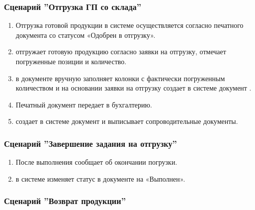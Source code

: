 

\subsubsection{Сценарий ''Отгрузка ГП со склада''}
\label{bp:goods_4}

\begin{enumerate}
\item	Отгрузка готовой продукции в системе \gofro  осуществляется \kladovshik согласно печатного документа  со статусом «Одобрен в отгрузку».
\item	\kladovshik отгружает готовую продукцию согласно заявки на отгрузку, отмечает погруженные позиции и количество.
\item	\kladovshik в документе  вручную заполняет колонки с фактически погруженным количеством и на основании заявки на отгрузку  создает в системе \gofro документ .
\item	Печатный документ \kladovshik передает в бухгалтерию.
\item   \auditor  создает в системе \erp документ  и выписывает сопроводительные документы.
\end{enumerate}



\subsubsection{Сценарий ''Завершение задания на отгрузку''}
\label{bp:goods_5}

\begin{enumerate}

\item После выполнения  \kladovshik сообщает \manager об окончании погрузки.
\item \manager в системе \gofro изменяет статус в документе  на «Выполнен».
\end{enumerate}





\subsubsection{Сценарий ''Возврат продукции''}
\label{bp:goods_6}

